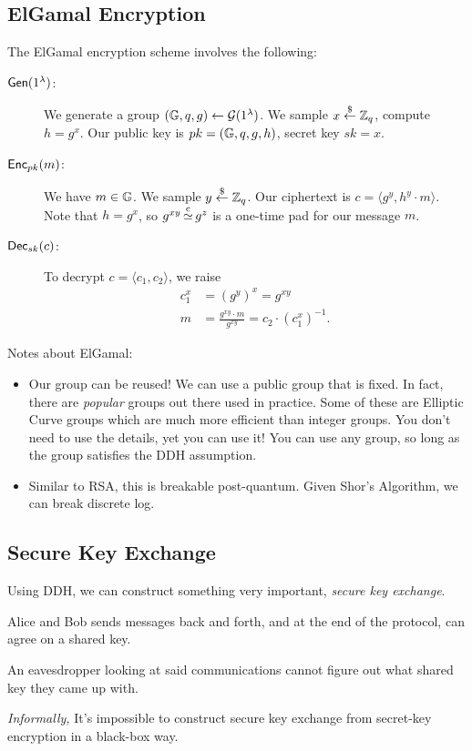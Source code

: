 \subsection{ElGamal Encryption}
The ElGamal encryption scheme involves the following:
\begin{description}
    \item[$\operatorname{\mathsf{Gen}}(1^\lambda)$:] We generate a group $(\mathbb G, q, g) \leftarrow \mathcal{G}(1^\lambda)$. We sample $x\overset{\$}{\leftarrow} \mathbb Z_q$, compute $h = g^x$. Our public key is $pk = (\mathbb G, q, g, h)$, secret key $sk = x$.
    \item[$\operatorname{\mathsf{Enc}}_{pk}(m)$:] We have $m\in\mathbb G$. We sample $y\overset{\$}{\leftarrow} \mathbb Z_q$. Our ciphertext is $c = \langle g^y, h^y\cdot m\rangle$. Note that $h = g^x$, so $g^{xy}\operatorname{\overset{c}{\simeq}} g^z$ is a one-time pad for our message $m$.
    \item[$\operatorname{\mathsf{Dec}}_{sk}(c)$:] To decrypt $c = \langle c_1, c_2\rangle$, we raise
        \begin{align*}
            c_1^x & = (g^y)^x = g^{xy}                                      \\
            m     & = \frac{g^{xy}\cdot m}{g^{xy}} = c_2\cdot (c_1^x)^{-1}.
        \end{align*}
\end{description}

Notes about ElGamal:
\begin{itemize}
    \item Our group can be reused! We can use a public group that is fixed. In fact, there are \emph{popular} groups out there used in practice. Some of these are Elliptic Curve groups which are much more efficient than integer groups. You don't need to use the details, yet you can use it! You can use any group, so long as the group satisfies the DDH assumption.
    \item Similar to RSA, this is breakable post-quantum. Given Shor's Algorithm, we can break discrete log.
\end{itemize}

\subsection{Secure Key Exchange}
Using DDH, we can construct something very important, \emph{secure key exchange}.
\begin{definition}
    Alice and Bob sends messages back and forth, and at the end of the protocol, can agree on a shared key.

    An eavesdropper looking at said communications cannot figure out what shared key they came up with.
\end{definition}
\begin{theorem}
    \emph{Informally,} It's impossible to construct secure key exchange from secret-key encryption in a black-box way.
\end{theorem}

